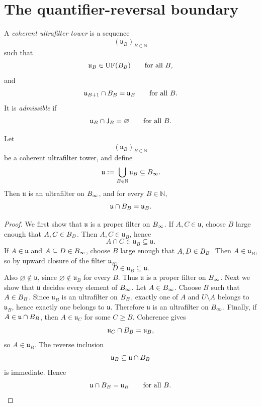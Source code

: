 \section{The quantifier-reversal boundary}
\begin{definition}
	A \emph{coherent ultrafilter tower} is a sequence
	\[
		(\mathfrak u_B)_{B\in\mathbb N}
	\]
	such that
	\[
		\mathfrak u_B\in\operatorname{UF}(B_B)
		\qquad
		\text{for all }B,
	\]
	and
	\[
		\mathfrak u_{B+1}\cap B_B=\mathfrak u_B
		\qquad
		\text{for all }B.
	\]
	It is \emph{admissible} if
	\[
		\mathfrak u_B\cap\mathsf J_B=\varnothing
		\qquad
		\text{for all }B.
	\]
\end{definition}
\begin{lemma}
	\label{lem:union-ultrafilter}
	Let
	\[
		(\mathfrak u_B)_{B\in\mathbb N}
	\]
	be a coherent ultrafilter tower, and define
	\[
		\mathfrak u:=\bigcup_{B\in\mathbb N}\mathfrak u_B\subseteq B_\infty.
	\]
	Then \(\mathfrak u\) is an ultrafilter on \(B_\infty\), and for every
	\(B\in\mathbb N\),
	\[
		\mathfrak u\cap B_B=\mathfrak u_B.
	\]
\end{lemma}
\begin{proof}
	We first show that \(\mathfrak u\) is a proper filter on \(B_\infty\).
	If \(A,C\in\mathfrak u\), choose \(B\) large enough that
	\(A,C\in B_B\). Then \(A,C\in\mathfrak u_B\), hence
	\[
		A\cap C\in\mathfrak u_B\subseteq\mathfrak u.
	\]
	If \(A\in\mathfrak u\) and \(A\subseteq D\in B_\infty\), choose \(B\)
	large enough that \(A,D\in B_B\). Then \(A\in\mathfrak u_B\), so by
	upward closure of the filter \(\mathfrak u_B\),
	\[
		D\in\mathfrak u_B\subseteq\mathfrak u.
	\]
	Also \(\varnothing\notin\mathfrak u\), since \(\varnothing\notin\mathfrak u_B\)
	for every \(B\). Thus \(\mathfrak u\) is a proper filter on
	\(B_\infty\).
	Next we show that \(\mathfrak u\) decides every element of \(B_\infty\).
	Let \(A\in B_\infty\). Choose \(B\) such that \(A\in B_B\). Since
	\(\mathfrak u_B\) is an ultrafilter on \(B_B\), exactly one of \(A\)
	and \(U\setminus A\) belongs to \(\mathfrak u_B\), hence exactly one
	belongs to \(\mathfrak u\). Therefore \(\mathfrak u\) is an ultrafilter
	on \(B_\infty\).
	Finally, if \(A\in \mathfrak u\cap B_B\), then \(A\in\mathfrak u_C\) for
	some \(C\ge B\). Coherence gives
	\[
		\mathfrak u_C\cap B_B=\mathfrak u_B,
	\]
	so \(A\in\mathfrak u_B\). The reverse inclusion
	\[
		\mathfrak u_B\subseteq \mathfrak u\cap B_B
	\]
	is immediate. Hence
	\[
		\mathfrak u\cap B_B=\mathfrak u_B
		\qquad
		\text{for all }B.
	\]
\end{proof}
